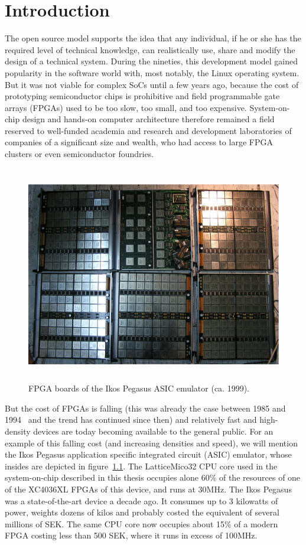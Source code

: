 \documentclass[a4paper,11pt]{kthesis}
\begin{document}
\tableofcontents
\listoffigures
\listoftables

\mainmatter

\chapter{Introduction}
The open source model supports the idea that any individual, if he or she has the required level of technical knowledge, can realistically use, share and modify the design of a technical system. During the nineties, this development model gained popularity in the software world with, most notably, the Linux operating system. But it was not viable for complex SoCs until a few years ago, because the cost of prototyping semiconductor chips is prohibitive and field programmable gate arrays (FPGAs) used to be too slow, too small, and too expensive. System-on-chip design and hands-on computer architecture therefore remained a field reserved to well-funded academia and research and development laboratories of companies of a significant size and wealth, who had access to large FPGA clusters or even semiconductor foundries.

\begin{figure}[htp]
\centering
\includegraphics[height=95mm]{ikosboards.eps}
\caption{FPGA boards of the Ikos Pegasus ASIC emulator (ca. 1999).}
\label{fig:ikos}
\end{figure}

But the cost of FPGAs is falling (this was already the case between 1985 and 1994~\cite{fpgacost} and the trend has continued since then) and relatively fast and high-density devices are today becoming available to the general public. For an example of this falling cost (and increasing densities and speed), we will mention the Ikos Pegasus application specific integrated circuit (ASIC) emulator, whose insides are depicted in figure~\ref{fig:ikos}. The LatticeMico32 CPU core used in the system-on-chip described in this thesis occupies alone 60\% of the resources of one of the XC4036XL FPGAs of this device, and runs at 30MHz. The Ikos Pegasus was a state-of-the-art device a decade ago. It consumes up to 3 kilowatts of power, weights dozens of kilos and probably costed the equivalent of several millions of SEK. The same CPU core now occupies about 15\% of a modern FPGA costing less than 500 SEK, where it runs in excess of 100MHz.
\end{document}

